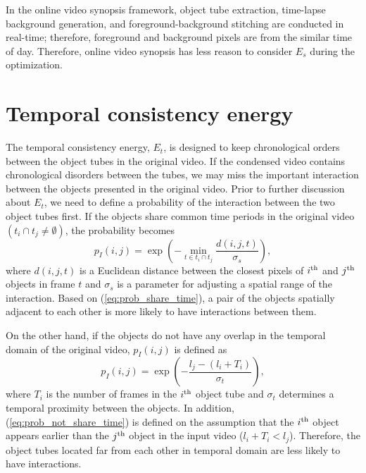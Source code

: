 \documentclass[11pt]{hyu_thesis}
\begin{document}
In the online video synopsis framework, object tube extraction, time-lapse background generation, and foreground-background stitching are conducted in real-time; therefore, foreground and background pixels are from the similar time of day. Therefore, online video synopsis has less reason to consider $E_s$ during the optimization.

\section{Temporal consistency energy}
The temporal consistency energy, $E_t$, is designed to keep chronological orders between the object tubes in the original video. If the condensed video contains chronological disorders between the tubes, we may miss the important interaction between the objects presented in the original video. Prior to further discussion about $E_t$, we need to define a probability of the interaction between the two object tubes first. If the objects share common time periods in the original video $(t_i \cap t_j \neq \emptyset)$, the probability becomes
\begin{equation}
\label{eq:prob_share_time}
p_I(i, j) = 
\exp\left(-\min_{t \in t_i \cap t_j} \frac{d(i,j,t)}{\sigma_s}\right),
\end{equation}
where $d(i,j,t)$ is a Euclidean distance between the closest pixels of $i^{\rm{th}}$ and $j^{\rm{th}}$ objects in frame $t$ and $\sigma_s$ is a parameter for adjusting a spatial range of the interaction. Based on (\ref{eq:prob_share_time}), a pair of the objects spatially adjacent to each other is more likely to have interactions between them.

On the other hand, if the objects do not have any overlap in the temporal domain of the original video, $p_I(i,j)$ is defined as
\begin{equation}
\label{eq:prob_not_share_time}
p_I(i,j)=\exp\left(-\frac{l_j - (l_i + T_i)}{\sigma_t}\right),
\end{equation}
where $T_i$ is the number of frames in the $i^{\rm{th}}$ object tube and $\sigma_t$ determines a temporal proximity between the objects. In addition, (\ref{eq:prob_not_share_time}) is defined on the assumption that the $i^{\rm{th}}$ object appears earlier than the $j^{\rm{th}}$ object in the input video ($l_i + T_i < l_j$). Therefore, the object tubes located far from each other in temporal domain are less likely to have interactions.
\end{document}
